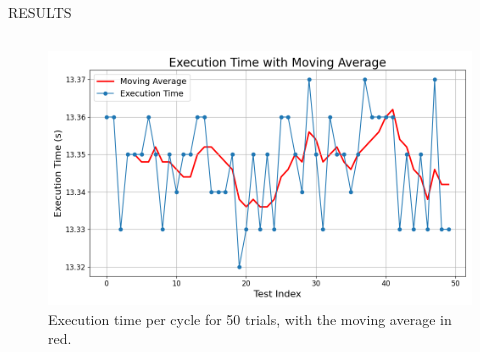\documentclass[%
  final,%
  english,%
  english,%
]{beamer}
\begin{document}
\begin{frame}[t, fragile = singleslide]
\begin{columns}[t, onlytextwidth]
\begin{column}{\textwidth}
\begin{block}{RESULTS}
\begin{column}[T]{0.49\textwidth}
\begin{table}[h]
    \caption{"Pick and Place" Test Results (50 Repetitions)}
    \label{tab:pick_place_results}\centering
\end{table}
\end{column}
\yellowvrule%
\begin{column}[T]{0.49\textwidth}
\begin{figure}[htbp]
    \centering
    \includegraphics[width=.6\columnwidth]{Figuras/validation_graphic.png} 
    \caption{Execution time per cycle for 50 trials, with the moving average in red.}
    \label{fig:execution_times}
\end{figure}
\end{column}
\end{block}
%
\end{column}
%
\end{columns}


\end{frame}
\end{document}
